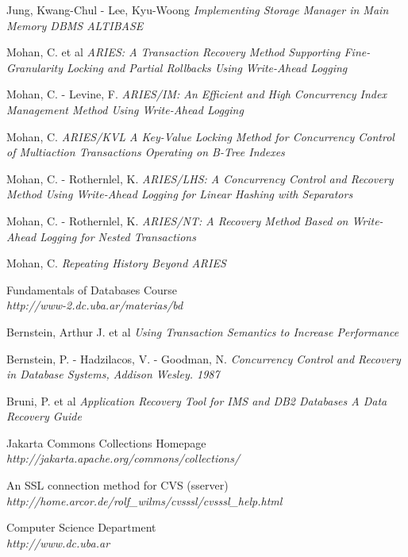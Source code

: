 \newpage
\begin{thebibliography}{99}

  Jung, Kwang-Chul - Lee, Kyu-Woong \emph{Implementing Storage Manager in Main Memory DBMS ALTIBASE}

  Mohan, C. et al \emph{ARIES: A Transaction Recovery Method Supporting Fine-Granularity Locking and Partial Rollbacks Using Write-Ahead Logging}

  Mohan, C. - Levine, F. \emph{ARIES/IM: An Efficient and
High Concurrency Index Management Method Using Write-Ahead Logging}

  Mohan, C. \emph{ARIES/KVL A Key-Value Locking Method for Concurrency Control of Multiaction Transactions Operating on B-Tree Indexes}

  Mohan, C. - Rothernlel, K. \emph{ARIES/LHS: A Concurrency Control and
Recovery Method Using Write-Ahead Logging for Linear Hashing with Separators}

  Mohan, C. - Rothernlel, K. \emph{ARIES/NT: A Recovery Method Based on Write-Ahead Logging for Nested Transactions}

  Mohan, C. \emph{Repeating History Beyond ARIES}

  Fundamentals of Databases Course \\ \emph{http://www-2.dc.uba.ar/materias/bd}

  Bernstein, Arthur J. et al \emph{Using Transaction Semantics to Increase Performance}

  Bernstein, P. - Hadzilacos, V. - Goodman, N. \emph{Concurrency Control and Recovery in Database Systems, Addison Wesley. 1987}

  Bruni, P. et al \emph{Application Recovery Tool for IMS and DB2 Databases
A Data Recovery Guide}
 
  Jakarta Commons Collections Homepage\\    \emph{http://jakarta.apache.org/commons/collections/}

  An SSL connection method for CVS (sserver) \\  \emph{http://home.arcor.de/rolf\_wilms/cvsssl/cvsssl\_help.html}

  Computer Science Department \\ \emph{http://www.dc.uba.ar}


\end{thebibliography}
